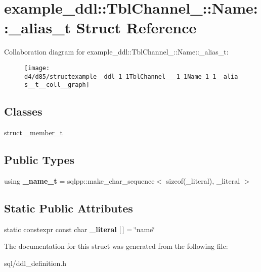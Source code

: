 \hypertarget{structexample__ddl_1_1TblChannel___1_1Name_1_1__alias__t}{}\section{example\+\_\+ddl\+:\+:Tbl\+Channel\+\_\+\+:\+:Name\+:\+:\+\_\+alias\+\_\+t Struct Reference}
\label{structexample__ddl_1_1TblChannel___1_1Name_1_1__alias__t}


Collaboration diagram for example\+\_\+ddl\+:\+:Tbl\+Channel\+\_\+\+:\+:Name\+:\+:\+\_\+alias\+\_\+t\+:
\nopagebreak
\begin{figure}[H]
\begin{center}
\leavevmode
\texttt{[image: d4/d85/structexample\_\_ddl\_1\_1TblChannel\_\_\_1\_1Name\_1\_1\_\_alias\_\_t\_\_coll\_\_graph]}
\end{center}
\end{figure}
\subsection*{Classes}
\begin{DoxyCompactItemize}
\item 
struct \hyperlink{structexample__ddl_1_1TblChannel___1_1Name_1_1__alias__t_1_1__member__t}{\+\_\+member\+\_\+t}
\end{DoxyCompactItemize}
\subsection*{Public Types}
\begin{DoxyCompactItemize}
\item 
\hypertarget{structexample__ddl_1_1TblChannel___1_1Name_1_1__alias__t_a0c5efeb1625424a888f6941b8571afcd}{}using {\bfseries \+\_\+name\+\_\+t} = sqlpp\+::make\+\_\+char\+\_\+sequence$<$ sizeof(\+\_\+literal), \+\_\+literal $>$\label{structexample__ddl_1_1TblChannel___1_1Name_1_1__alias__t_a0c5efeb1625424a888f6941b8571afcd}

\end{DoxyCompactItemize}
\subsection*{Static Public Attributes}
\begin{DoxyCompactItemize}
\item 
\hypertarget{structexample__ddl_1_1TblChannel___1_1Name_1_1__alias__t_a843185545b619093161a17902308d287}{}static constexpr const char {\bfseries \+\_\+literal} \mbox{[}$\,$\mbox{]} = \char`\"{}name\char`\"{}\label{structexample__ddl_1_1TblChannel___1_1Name_1_1__alias__t_a843185545b619093161a17902308d287}

\end{DoxyCompactItemize}


The documentation for this struct was generated from the following file\+:\begin{DoxyCompactItemize}
\item 
sql/ddl\+\_\+definition.\+h\end{DoxyCompactItemize}
